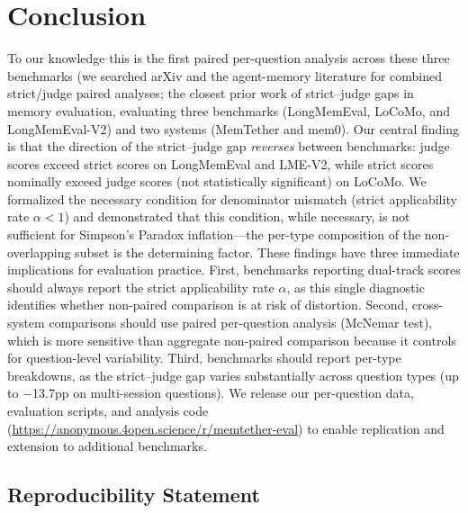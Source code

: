\documentclass[10pt]{article}
\begin{document}
\section{Conclusion}
To our knowledge this is the first paired per-question analysis across these three benchmarks
(we searched arXiv and the agent-memory literature for combined strict/judge paired analyses;
the closest prior work of strict--judge gaps in memory evaluation, evaluating three benchmarks (LongMemEval, LoCoMo, and LongMemEval-V2) and two systems (MemTether and mem0). Our central finding is that the direction of the strict--judge gap \emph{reverses} between benchmarks: judge scores exceed strict scores on LongMemEval and LME-V2, while strict scores nominally exceed judge scores (not statistically significant) on LoCoMo. We formalized the necessary condition for denominator mismatch (strict applicability rate $\alpha < 1$) and demonstrated that this condition, while necessary, is not sufficient for Simpson's Paradox inflation---the per-type composition of the non-overlapping subset is the determining factor. These findings have three immediate implications for evaluation practice. First, benchmarks reporting dual-track scores should always report the strict applicability rate $\alpha$, as this single diagnostic identifies whether non-paired comparison is at risk of distortion. Second, cross-system comparisons should use paired per-question analysis (McNemar test), which is more sensitive than aggregate non-paired comparison because it controls for question-level variability. Third, benchmarks should report per-type breakdowns, as the strict--judge gap varies substantially across question types (up to $-$13.7pp on multi-session questions). We release our per-question data, evaluation scripts, and analysis code (\url{https://anonymous.4open.science/r/memtether-eval}) to enable replication and extension to additional benchmarks.



\subsection*{Reproducibility Statement}
\end{document}
